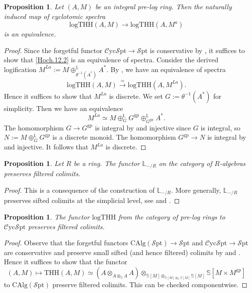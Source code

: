 \documentclass[11pt, a4paper]{amsart}
\newtheorem{prop}[thm]{Proposition}
\theoremstyle{definition}
\numberwithin{equation}{subsection}
\newcommand{\bbL}{\mathbb{L}}
\newcommand{\THH}{\mathrm{THH}}
\newcommand{\Sphere}{\mathbb{S}}
\newcommand{\gp}{{\mathrm{gp}}}
\newcommand{\logTHH}{\mathrm{logTHH}}
\newcommand{\infSpt}{\mathcal{S}\mathrm{pt}}
\newcommand{\infCycSpt}{\mathcal{C}\mathrm{yc}\mathcal{S}\mathrm{pt}}
\newcommand{\CAlg}{\mathrm{CAlg}}
\begin{document}
\begin{prop}
\label{Hoch.12}
Let $(A,M)$ be an integral pre-log ring.
Then the naturally induced map of cyclotomic spectra
\begin{equation}
\label{Hoch.12.2}
\logTHH(A,M)
\to
\logTHH(A,M^a)
\end{equation}
is an equivalence.
\end{prop}
\begin{proof}
Since the forgetful functor $\infCycSpt\to \infSpt$ is conservative by 
\cite[Corollary II.1.7]{NikolausScholze},
it suffices to show that \eqref{Hoch.12.2} is an equivalence of spectra.
Consider the derived logification $M^{La}:=M\oplus_{\theta^{-1}(A^*)}^{\bbL} A^*$.
By \cite[Theorem 4.24]{RSS},
we have an equivalence of spectra
\[
\logTHH(A,M)
\xrightarrow{\simeq}
\logTHH(A,M^{La}).
\]
Hence it suffices to show that $M^{La}$ is discrete.
We set $G:=\theta^{-1}(A^*)$ for simplicity.
Then we have an equivalence
\[
M^{La}
\simeq
M\oplus_G^\bbL G^\gp \oplus_{G^\gp}^\bbL A^*.
\]
The homomorphism $G\to G^\gp$ is integral by \cite[Proposition I.4.6.3(3)]{Ogu} and injective since $G$ is integral,
so $N:=M\oplus_G^\bbL G^\gp$ is a discrete monoid.
The homomorphism $G^\gp\to N$ is integral by \cite[Proposition I.4.6.3(2)]{Ogu} and injective.
It follows that $M^{La}$ is discrete.
\end{proof}






\begin{prop}
\label{THHsheaf.6}
Let $R$ be a ring.
The functor $\bbL_{-/R}$ on the category of $R$-algebras preserves filtered colimits.
\end{prop}
\begin{proof}
This is a consequence of the construction of $\bbL_{-/R}$.
More generally,
$\bbL_{-/R}$ preserves sifted colimits at the simplicial level,
see \cite[Construction 2.1]{BMS19} and \cite[\S 2.5]{BLPO}.
\end{proof}

\begin{prop}
\label{THHsheaf.4}
The functor $\logTHH$ from the category of pre-log rings to $\infCycSpt$ preserves filtered colimits.
\end{prop}
\begin{proof}
Observe that the forgetful functors $\CAlg(\infSpt)\to \infSpt$ and $\infCycSpt\to \infSpt$ are conservative and preserve small sifted (and hence filtered) colimits by \cite[Corollary 3.2.3.2]{HA} and \cite[Corollary II.1.7]{NikolausScholze}.
Hence it suffices to show that the functor
\[
(A,M)
\mapsto 
\THH(A,M)
\simeq
(A\otimes_{A\otimes_{\Sphere} A} A)\otimes_{\Sphere[M]\otimes_{\Sphere[M]\otimes_{\Sphere}\Sphere[M]} \Sphere[M]}\Sphere[M\times M^\gp]
\]
to $\CAlg(\infSpt)$ preserve filtered colimits.
This can be checked componentwise.
\end{proof}
\end{document}
